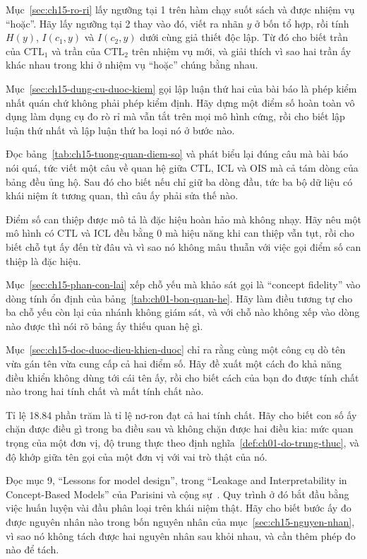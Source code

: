 \cauhoi
\begin{cauhoids}
  \item Mục~\ref{sec:ch15-ro-ri} lấy ngưỡng tại 1 trên hàm chạy suốt sách và
được nhiệm vụ \enquote{hoặc}. Hãy lấy ngưỡng tại 2 thay vào đó, viết ra nhãn
$y$ ở bốn tổ hợp, rồi tính $H(y)$, $I(c_1,y)$ và $I(c_2,y)$ dưới cùng giả thiết
độc lập. Từ đó cho biết trần của $\mathrm{CTL}_1$ và trần của $\mathrm{CTL}_2$
trên nhiệm vụ mới, và giải thích vì sao hai trần ấy khác nhau trong khi ở nhiệm
vụ \enquote{hoặc} chúng bằng nhau.
  \item Mục~\ref{sec:ch15-dung-cu-duoc-kiem} gọi lập luận thứ hai của bài báo là
phép kiểm nhất quán chứ không phải phép kiểm định. Hãy dựng một điểm số hoàn
toàn vô dụng làm dụng cụ đo rò rỉ mà vẫn tắt trên mọi mô hình cứng, rồi cho biết
lập luận thứ nhất và lập luận thứ ba loại nó ở bước nào.
  \item Đọc bảng~\ref{tab:ch15-tuong-quan-diem-so} và phát biểu lại đúng câu mà
bài báo nói quá, tức viết một câu về quan hệ giữa CTL, ICL và OIS mà cả tám dòng
của bảng đều ủng hộ. Sau đó cho biết nếu chỉ giữ ba dòng đầu, tức ba bộ dữ liệu
có khái niệm ít tương quan, thì câu ấy phải sửa thế nào.
  \item Điểm số can thiệp được mô tả là đặc hiệu hoàn hảo mà không nhạy. Hãy nêu
một mô hình có $\mathrm{CTL}$ và $\mathrm{ICL}$ đều bằng 0 mà hiệu năng khi can
thiệp vẫn tụt, rồi cho biết chỗ tụt ấy đến từ đâu và vì sao nó không mâu thuẫn
với việc gọi điểm số can thiệp là đặc hiệu.
  \item Mục~\ref{sec:ch15-phan-con-lai} xếp chỗ yếu mà khảo sát gọi là
\enquote{concept fidelity} vào dòng tính ổn định của
bảng~\ref{tab:ch01-bon-quan-he}. Hãy làm điều tương tự cho ba chỗ yếu còn lại
của nhánh không giám sát, và với chỗ nào không xếp vào dòng nào được thì nói rõ
bảng ấy thiếu quan hệ gì.
  \item Mục~\ref{sec:ch15-doc-duoc-dieu-khien-duoc} chỉ ra rằng cùng một công cụ
dò tên vừa gán tên vừa cung cấp cả hai điểm số. Hãy đề xuất một cách đo khả năng
điều khiển không dùng tới cái tên ấy, rồi cho biết cách của bạn đo được tính
chất nào trong hai tính chất và mất tính chất nào.
  \item Tỉ lệ 18.84 phần trăm là tỉ lệ nơ-ron đạt cả hai tính chất. Hãy cho biết
con số ấy chặn được điều gì trong ba điều sau và không chặn được hai điều kia:
mức quan trọng của một đơn vị, độ trung thực theo
định nghĩa~\ref{def:ch01-do-trung-thuc}, và độ khớp giữa tên gọi của một đơn vị
với vai trò thật của nó.
  \item Đọc mục 9, \enquote{Lessons for model design}, trong \enquote{Leakage
and Interpretability in Concept-Based Models} của Parisini và cộng
sự~\autocite{p30leakage}. Quy trình ở đó bắt đầu bằng việc huấn luyện vài đầu
phân loại trên khái niệm thật. Hãy cho biết bước ấy đo được nguyên nhân nào
trong bốn nguyên nhân của mục~\ref{sec:ch15-nguyen-nhan}, vì sao nó không tách
được hai nguyên nhân sau khỏi nhau, và cần thêm phép đo nào để tách.
\end{cauhoids}
